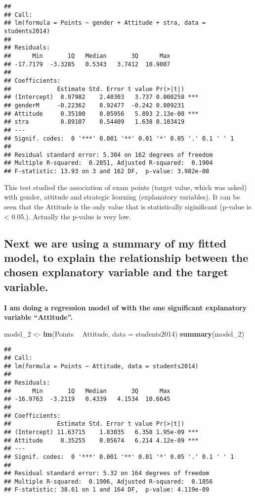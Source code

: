 \documentclass[]{article}
\newenvironment{Shaded}{\begin{snugshade}}{\end{snugshade}}
\newcommand{\DataTypeTok}[1]{\textcolor[rgb]{0.13,0.29,0.53}{#1}}
\newcommand{\DecValTok}[1]{\textcolor[rgb]{0.00,0.00,0.81}{#1}}
\newcommand{\KeywordTok}[1]{\textcolor[rgb]{0.13,0.29,0.53}{\textbf{#1}}}
\newcommand{\NormalTok}[1]{#1}
\newcommand{\OperatorTok}[1]{\textcolor[rgb]{0.81,0.36,0.00}{\textbf{#1}}}
\newcommand{\StringTok}[1]{\textcolor[rgb]{0.31,0.60,0.02}{#1}}
\begin{document}
\begin{verbatim}
## 
## Call:
## lm(formula = Points ~ gender + Attitude + stra, data = students2014)
## 
## Residuals:
##      Min       1Q   Median       3Q      Max 
## -17.7179  -3.3285   0.5343   3.7412  10.9007 
## 
## Coefficients:
##             Estimate Std. Error t value Pr(>|t|)    
## (Intercept)  8.97982    2.40303   3.737 0.000258 ***
## genderM     -0.22362    0.92477  -0.242 0.809231    
## Attitude     0.35100    0.05956   5.893 2.13e-08 ***
## stra         0.89107    0.54409   1.638 0.103419    
## ---
## Signif. codes:  0 '***' 0.001 '**' 0.01 '*' 0.05 '.' 0.1 ' ' 1
## 
## Residual standard error: 5.304 on 162 degrees of freedom
## Multiple R-squared:  0.2051, Adjusted R-squared:  0.1904 
## F-statistic: 13.93 on 3 and 162 DF,  p-value: 3.982e-08
\end{verbatim}

This test studied the association of exam points (target value, which
was asked) with gender, attitude and strategic learning (explanatory
variables). It can be seen that the Attitude is the only value that is
statistically siginificant (p-value is \textless{} 0.05.). Actually the
p-value is very low.

\hypertarget{next-we-are-using-a-summary-of-my-fitted-model-to-explain-the-relationship-between-the-chosen-explanatory-variable-and-the-target-variable.}{%
\subsection{Next we are using a summary of my fitted model, to explain
the relationship between the chosen explanatory variable and the target
variable.}\label{next-we-are-using-a-summary-of-my-fitted-model-to-explain-the-relationship-between-the-chosen-explanatory-variable-and-the-target-variable.}}

\textbf{I am doing a regression model of with the one significant
explanatory variable ``Attitude''. }

\begin{Shaded}
\begin{Highlighting}[]
\NormalTok{model_}\DecValTok{2}\NormalTok{ <-}\StringTok{ }\KeywordTok{lm}\NormalTok{(Points }\OperatorTok{~}\StringTok{ }\NormalTok{Attitude, }\DataTypeTok{data =}\NormalTok{ students2014)}
\KeywordTok{summary}\NormalTok{(model_}\DecValTok{2}\NormalTok{)}
\end{Highlighting}
\end{Shaded}

\begin{verbatim}
## 
## Call:
## lm(formula = Points ~ Attitude, data = students2014)
## 
## Residuals:
##      Min       1Q   Median       3Q      Max 
## -16.9763  -3.2119   0.4339   4.1534  10.6645 
## 
## Coefficients:
##             Estimate Std. Error t value Pr(>|t|)    
## (Intercept) 11.63715    1.83035   6.358 1.95e-09 ***
## Attitude     0.35255    0.05674   6.214 4.12e-09 ***
## ---
## Signif. codes:  0 '***' 0.001 '**' 0.01 '*' 0.05 '.' 0.1 ' ' 1
## 
## Residual standard error: 5.32 on 164 degrees of freedom
## Multiple R-squared:  0.1906, Adjusted R-squared:  0.1856 
## F-statistic: 38.61 on 1 and 164 DF,  p-value: 4.119e-09
\end{verbatim}
\end{document}
